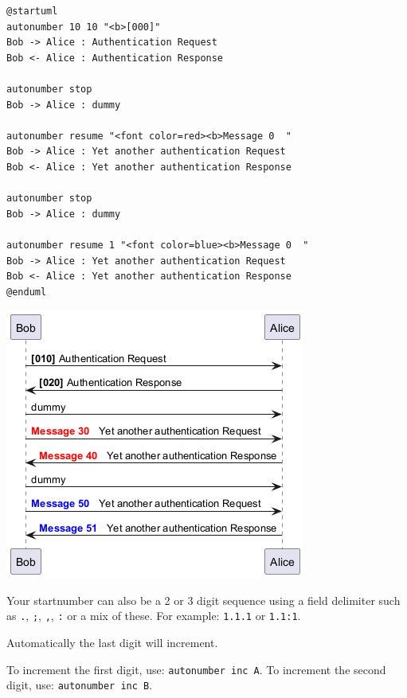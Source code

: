 \begin{verbatim}
@startuml
autonumber 10 10 "<b>[000]"
Bob -> Alice : Authentication Request
Bob <- Alice : Authentication Response

autonumber stop
Bob -> Alice : dummy

autonumber resume "<font color=red><b>Message 0  "
Bob -> Alice : Yet another authentication Request
Bob <- Alice : Yet another authentication Response

autonumber stop
Bob -> Alice : dummy

autonumber resume 1 "<font color=blue><b>Message 0  "
Bob -> Alice : Yet another authentication Request
Bob <- Alice : Yet another authentication Response
@enduml
\end{verbatim}
\begin{center}
\includegraphics[scale=0.60]{imgw/img-0d05e1597b1eff1b6e8a7f72af608928.png}
\end{center}


Your startnumber can also be a 2 or 3 digit sequence using a field delimiter such as \texttt{.}, \texttt{;}, \texttt{,}, \texttt{:} or a mix of these. For example: \texttt{1.1.1} or \texttt{1.1:1}.


Automatically the last digit will increment.


To increment the first digit, use: \texttt{autonumber inc A}. To increment the second digit, use: \texttt{autonumber inc B}. 


